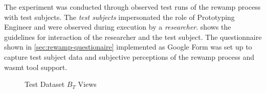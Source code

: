The experiment was conducted through observed test runs of the \gls{rewamp} process with test subjects.
The \emph{test subjects} impersonated the role of Prototyping Engineer and were observed during execution by a \emph{researcher}.
 shows the guidelines for interaction of the researcher and the test subject.
The questionnaire shown in \cref{sec:rewamp-questionaire} implemented as Google Form was set up to capture test subject data and subjective perceptions of the \gls{rewamp} process and \gls{wasmt} tool support.
\begin{figure}[h!]
    \centering
    \qquad
    \caption{Test Dataset $B_T$ Views}
    \label{fig:rewamp-myCal}
\end{figure}

